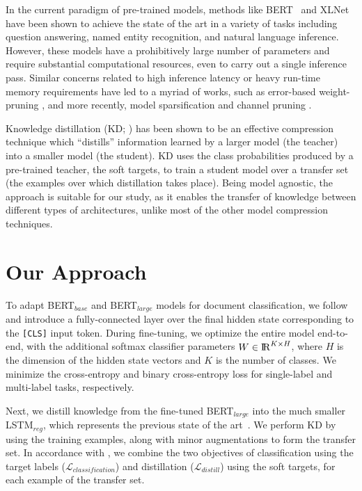 \documentclass[11pt,a4paper]{article}
\newcommand{\BLSTMR}[1]{LSTM$_{reg}$}
\newcommand{\BERTL}[1]{BERT$_{large}$}
\newcommand{\BERTB}[1]{BERT$_{base}$}
\begin{document}
In the current paradigm of pre-trained models, methods like BERT~\cite{devlin2018bert} and XLNet~\cite{Yang2019XLNetGA} have been shown to achieve the state of the art in a variety of tasks including question answering, named entity recognition, and natural language inference.
However, these models have a prohibitively large number of parameters and require substantial computational resources, even to carry out a single inference pass.
Similar concerns related to high inference latency or heavy run-time memory requirements have led to a myriad of works, such as error-based weight-pruning \cite{lecunprune}, and more recently, model sparsification and channel pruning \cite{loprune, netslim}.

Knowledge distillation (KD; \citealp{bakd, hintonkd}) has been shown to be an effective compression technique which ``distills'' information learned by a larger model (the teacher) into a smaller model (the student).
KD uses the class probabilities produced by a pre-trained teacher, the soft targets, to train a student model over a transfer set (the examples over which distillation takes place).
Being model agnostic, the approach is suitable for our study, as it enables the transfer of knowledge between different types of architectures, unlike most of the other model compression techniques.

\section{Our Approach}

To adapt \BERTB{} and \BERTL{} models for document classification, we follow \citet{devlin2018bert} and introduce a fully-connected layer over the final hidden state corresponding to the \texttt{[CLS]} input token.
During fine-tuning, we optimize the entire model end-to-end, with the additional softmax classifier parameters $W \in {\rm I\!R}^{K \times H}$, where $H$ is the dimension of the hidden state vectors and $K$ is the number of classes.
We minimize the cross-entropy and binary cross-entropy loss for single-label and multi-label tasks, respectively.

Next, we distill knowledge from the fine-tuned \BERTL{} into the much smaller \BLSTMR{}, which represents the previous state of the art~\cite{adhikari2019rethinking}.
We perform KD by using the training examples, along with minor augmentations to form the transfer set.
In accordance with \citet{hintonkd}, we combine the two objectives of classification using the target labels ($\mathcal{L}_{classification}$) and distillation ($\mathcal{L}_{distill}$) using the soft targets, for each example of the transfer set.
\end{document}
